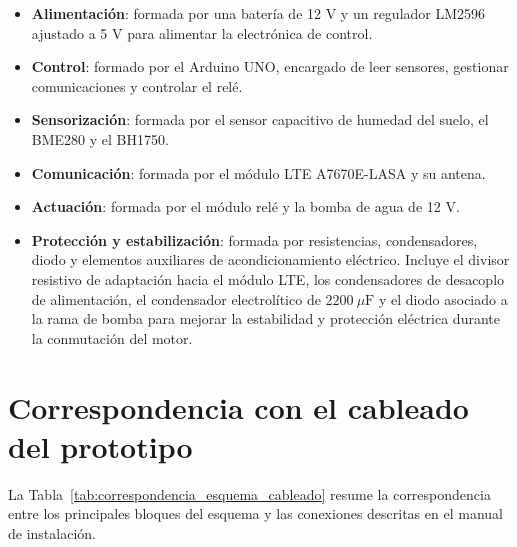 \begin{itemize}
    \item \textbf{Alimentación}: formada por una batería de 12 V y un regulador LM2596 ajustado a 5 V para alimentar la electrónica de control.
    \item \textbf{Control}: formado por el Arduino UNO, encargado de leer sensores, gestionar comunicaciones y controlar el relé.
    \item \textbf{Sensorización}: formada por el sensor capacitivo de humedad del suelo, el BME280 y el BH1750.
    \item \textbf{Comunicación}: formada por el módulo LTE A7670E-LASA y su antena.
    \item \textbf{Actuación}: formada por el módulo relé y la bomba de agua de 12 V.
    \item \textbf{Protección y estabilización}: formada por resistencias, condensadores, diodo y elementos auxiliares de acondicionamiento eléctrico. Incluye el divisor resistivo de adaptación hacia el módulo LTE, los condensadores de desacoplo de alimentación, el condensador electrolítico de \(2200~\mu\mathrm{F}\) y el diodo asociado a la rama de bomba para mejorar la estabilidad y protección eléctrica durante la conmutación del motor.
\end{itemize}

\section{Correspondencia con el cableado del prototipo}

La Tabla~\ref{tab:correspondencia_esquema_cableado} resume la correspondencia entre los principales bloques del esquema y las conexiones descritas en el manual de instalación.

\begingroup
\renewcommand{\arraystretch}{1.35}
\scriptsize
{}

